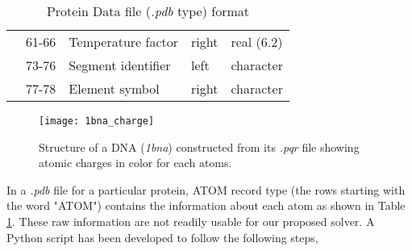 \begin{table}[!ht]
\begin{tabular}{|l|l|l|l|l|}
                        & 61-66   & Temperature factor              & right         & real (6.2) \\ \cline{2-5} 
                        & 73-76   & Segment identifier              & left          & character  \\ \cline{2-5} 
                        & 77-78   & Element symbol                  & right         & character  \\ \hline
\end{tabular}
\caption{Protein Data file (\textit{.pdb} type) format}
\label{tab:PDB_format}
\end{table}
\begin{figure}
	\centering
	\texttt{[image: 1bna\_charge]}
	\caption{Structure of a DNA (\textit{1bna}) constructed from its {\it .pqr} file showing atomic charges in color for each atoms.} 
\end{figure}

 In a \textit{.pdb} file for a particular protein, ATOM record type (the rows starting with the word "ATOM") contains the information about each atom as shown in Table \ref{tab:PDB_format}. These raw information are not readily usable for our proposed solver. A Python script has been developed to follow the following steps,
 
